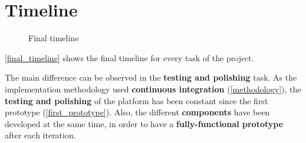 \documentclass[a4paper,11pt,titlepage,abstract,numbers=noenddot,automark,mnsy,intlimits,rgb,dvipsnames]{report}
\begin{document}
\section{Timeline}
\begin{figure}[H]
\caption{Final timeline}
\label{final_timeline}
\end{figure}
\autoref{final_timeline} shows the final timeline for every task of the project.

The main difference can be observed in the \textbf{testing and polishing} task. As the implementation methodology
used \textbf{continuous integration} (\autoref{methodology}), the \textbf{testing and polishing} of the platform has been
constant since the first prototype (\autoref{first_prototype}). Also, the different \textbf{components} have been developed
at the same time, in order to have a \textbf{fully-functional prototype} after each iteration.
\end{document}
